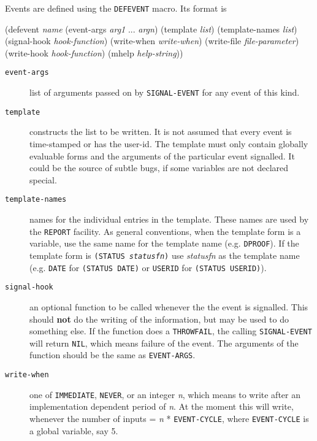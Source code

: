 Events are defined using the {\tt DEFEVENT} macro.
Its format is

\begin{tpsexample}
(defevent {\it name}
  (event-args {\it arg1} ... {\it argn})
  (template {\it list})
  (template-names {\it list})
  (signal-hook {\it hook-function})
  (write-when {\it write-when})
  (write-file {\it file-parameter})
  (write-hook {\it hook-function})
  (mhelp {\it help-string}))
\end{tpsexample}

\begin{description}
\item[{\tt event-args} ]	  list of arguments passed on by {\tt SIGNAL-EVENT} for any event
	of this kind.

\item[{\tt template} ]	  constructs the list to be written.
        It is not assumed that every event is
	time-stamped or has the user-id.  The template
        must only contain globally evaluable forms and the arguments
	of the particular event signalled.  It could be the source of
        subtle bugs, if some variables are not declared special.

\item[{\tt template-names} ]	  names for the individual entries in the template.
These names are used by the {\tt REPORT} facility.  As general conventions,
when the template form is a variable, use the same name for the
template name (e.g. {\tt DPROOF}).  If the template form is {\tt (STATUS {\it statusfn})}
use {\it statusfn} as the template name (e.g. {\tt DATE} for {\tt (STATUS DATE)} or
{\tt USERID} for {\tt (STATUS USERID)}).

\item[{\tt signal-hook} ]	  an optional function to be called whenever the
	the event is signalled.  This should {\bf not} do the writing of
	the information, but may be used to do something else.  If the
        function does a {\tt THROWFAIL}, the calling {\tt SIGNAL-EVENT} will
        return {\tt NIL}, which means failure of the event.  The arguments
        of the function should be the same as {\tt EVENT-ARGS}.

\item[{\tt write-when} ]	  one of {\tt IMMEDIATE}, {\tt NEVER}, or an integer {\it n}, which means
     to write after an implementation dependent period of {\it n}.
     At the moment this will write, whenever the number of inputs = {\it n}
     * {\tt EVENT-CYCLE}, where {\tt EVENT-CYCLE} is a global variable, say 5.


\end{description}

